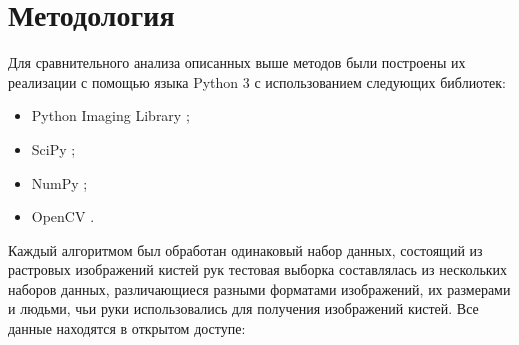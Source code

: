 \section{Методология}
\label{sec:Method}

Для сравнительного анализа описанных выше методов были построены их реализации с помощью языка Python 3 с использованием следующих библиотек:

\begin{itemize}
	\item Python Imaging Library \cite{PIL};
	\item SciPy \cite{scipy};
	\item NumPy \cite{numpy};
	\item OpenCV \cite{opencv}.
\end{itemize} 

Каждый алгоритмом был обработан одинаковый набор данных, состоящий из растровых изображений кистей рук тестовая выборка составлялась из нескольких наборов данных, различающиеся разными форматами изображений, их размерами и людьми, чьи руки использовались для получения изображений кистей. Все данные находятся в открытом доступе:

